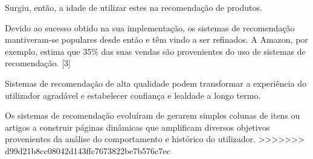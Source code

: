Surgiu, então, a idade de utilizar estes na recomendação de produtos. 

Devido ao sucesso obtido na sua implementação, os sistemas de recomendação mantiveram-se populares desde então e têm vindo a ser refinados. A Amazon, por exemplo, estima que 35\% das suas vendas são provenientes do uso de sistemas de recomendação. [3] 

Sistemas de recomendação de alta qualidade podem transformar a experiência do utilizador agradável e estabelecer confiança e lealdade a longo termo. 

Os sistemas de recomendação evoluíram de gerarem simples colunas de itens ou artigos a construir páginas dinâmicas que amplificam diversos objetivos provenientes da análise do comportamento e histórico do utilizador. 
>>>>>>> d99d21b8cc08042d143ffc7673822be7b576c7ec
